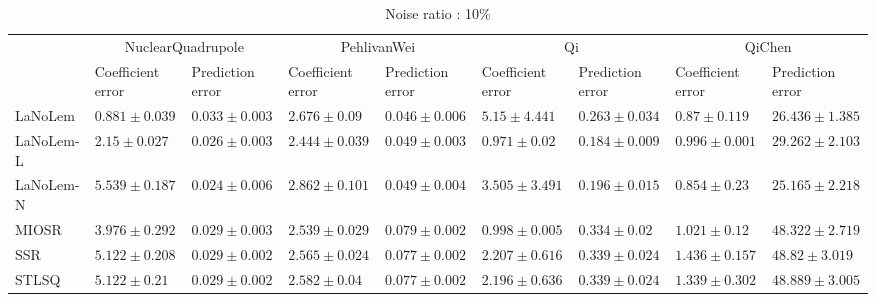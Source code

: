 \begin{table*}
\centering
\caption{Noise ratio : 10\%}
\label{}
\scalebox{0.7}
{
\begin{tabular}{lllllllll}
\toprule
 & \multicolumn{2}{c}{NuclearQuadrupole} & \multicolumn{2}{c}{PehlivanWei} & \multicolumn{2}{c}{Qi} & \multicolumn{2}{c}{QiChen} \\
 & Coefficient error & Prediction error & Coefficient error & Prediction error & Coefficient error & Prediction error & Coefficient error & Prediction error \\
\midrule
LaNoLem & $\mathbf{0.881}\pm 0.039$ & $0.033\pm 0.003$ & $2.676\pm 0.09$ & $\mathbf{0.046}\pm 0.006$ & $5.15\pm 4.441$ & $0.263\pm 0.034$ & $0.87\pm 0.119$ & $26.436\pm 1.385$ \\
LaNoLem-L & $2.15\pm 0.027$ & $0.026\pm 0.003$ & $\mathbf{2.444}\pm 0.039$ & $0.049\pm 0.003$ & $\mathbf{0.971}\pm 0.02$ & $\mathbf{0.184}\pm 0.009$ & $0.996\pm 0.001$ & $29.262\pm 2.103$ \\
LaNoLem-N & $5.539\pm 0.187$ & $\mathbf{0.024}\pm 0.006$ & $2.862\pm 0.101$ & $0.049\pm 0.004$ & $3.505\pm 3.491$ & $0.196\pm 0.015$ & $\mathbf{0.854}\pm 0.23$ & $\mathbf{25.165}\pm 2.218$ \\
MIOSR & $3.976\pm 0.292$ & $0.029\pm 0.003$ & $2.539\pm 0.029$ & $0.079\pm 0.002$ & $0.998\pm 0.005$ & $0.334\pm 0.02$ & $1.021\pm 0.12$ & $48.322\pm 2.719$ \\
SSR & $5.122\pm 0.208$ & $0.029\pm 0.002$ & $2.565\pm 0.024$ & $0.077\pm 0.002$ & $2.207\pm 0.616$ & $0.339\pm 0.024$ & $1.436\pm 0.157$ & $48.82\pm 3.019$ \\
STLSQ & $5.122\pm 0.21$ & $0.029\pm 0.002$ & $2.582\pm 0.04$ & $0.077\pm 0.002$ & $2.196\pm 0.636$ & $0.339\pm 0.024$ & $1.339\pm 0.302$ & $48.889\pm 3.005$ \\

\midrule


\end{tabular}}
\end{table*}
